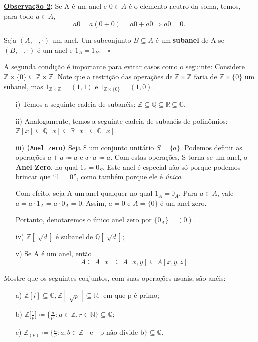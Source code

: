\documentclass[algebraII_notes.tex]{subfiles}
\begin{document}
\textbf{\underline{Observação 2}:} Se A é um anel e \(0\in A\) é o elemento neutro da soma, temos, para todo \(a\in A\),
\[
	a0 = a(0+0) = a0 + a0 \Rightarrow a0 = 0.
\]
\begin{def*}
	Seja \((A, +, \cdot )\) um anel. Um subconjunto \(B\subseteq{A}\) é um \textbf{subanel} de A se \((B, +, \cdot )\) é um anel e \(1_{A} = 1_{B}.\quad\square\)
\end{def*}
A segunda condição é importante para evitar casos como o seguinte: Considere \(\mathbb{Z}\times \{0\}\subseteq{\mathbb{Z}\times \mathbb{Z}}.\) Note que a restrição
das operações de \(\mathbb{Z}\times \mathbb{Z}\) faria de \(\mathbb{Z}\times \{0\}\) um subanel, mas \(1_{\mathbb{Z}\times \mathbb{Z}} = (1, 1)\) e \(1_{\mathbb{Z}\times\{0\}}=(1, 0).\)
\begin{example}
	\begin{itemize}
		\item[i)] Temos a seguinte cadeia de subanéis: \(\mathbb{Z}\subseteq{\mathbb{Q}}\subseteq{\mathbb{R}}\subseteq{\mathbb{C}}.\)
		\item[ii)] Analogamente, temos a seguinte cadeia de subanéis de polinômios: \(\mathbb{Z}[x]\subseteq{\mathbb{Q}[x]}\subseteq{\mathbb{R}[x]}\subseteq{\mathbb{C}[x]}\).
		\item[iii)]\texttt{(Anel zero)} Seja S um conjunto unitário \(S = \{a\}.\) Podemos definir as operações \(a + a\coloneqq a\) e \(a \cdot a\coloneqq a\). Com estas operações,
		      S torna-se um anel, o \textbf{Anel Zero}, no qual \(1_{S} = 0_{S}\). Este anel é especial não só porque podemos brincar que ``1 = 0'', como também porque ele é \textit{único}.

		      Com efeito, seja A um anel qualquer no qual \(1_{A} = 0_{A}\). Para \(a\in A\), vale \(a = a \cdot 1_{A} = a \cdot 0_{A} = 0.\) Assim, \(a = 0\) e \(A = \{0\}\) é
		      um anel zero.

		      Portanto, denotaremos o único anel zero por \(\{0_{A}\} = (0).\)
		\item[iv)] \(\mathbb{Z}[\sqrt[]{d}]\) é subanel de \(\mathbb{Q}[\sqrt[]{d}]\);
		\item[v)] Se A é um anel, então
		      \[
			      A\subseteq A[x] \subseteq A[x, y] \subseteq A[x, y, z].
		      \]
	\end{itemize}
\end{example}
\begin{example}[Exercícios]
	Mostre que os seguintes conjuntos, com suas operações usuais, são anéis:
	\begin{itemize}
		\item[a)] \(\mathbb{Z}[i] \subseteq{\mathbb{C}}, \mathbb{Z}[\sqrt[]{p}]\subseteq{\mathbb{R}},\) em que p é primo;
		\item[b)] \(\mathbb{Z}\biggl[\frac{1}{p}\biggr]\coloneqq \biggl\{\frac{a}{p^{r}}: a\in \mathbb{Z}, r\in \mathbb{N}\biggr\}\subseteq{\mathbb{Q}}\);
		\item[c)] \(\mathbb{Z}_{(p)}\coloneqq \biggl\{\frac{a}{b}: a, b\in \mathbb{Z}\quad \text{e}\quad \text{p não divide b} \biggr\}\subseteq{\mathbb{Q}}\).
	\end{itemize}
\end{example}
\end{document}
